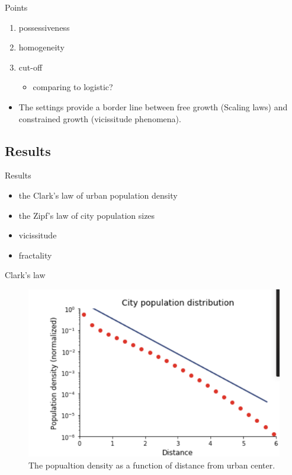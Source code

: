 \documentclass{beamer}
\begin{document}
\begin{frame}{Points}
  \begin{enumerate}
    \item possessiveness
    \item homogeneity
    \item cut-off
    \begin{itemize}
    \item comparing to logistic?
    \end{itemize}
  \end{enumerate}
  \vspace{1cm}
  \begin{itemize}
    \item The settings provide a border line between free growth (Scaling laws) and constrained growth (vicissitude phenomena).
  \end{itemize}
  
\end{frame}

\subsection{Results}
\begin{frame}{Results}
  \begin{itemize}
    \item the Clark's law of urban population density
    \item the Zipf's law of city population sizes
    \item vicissitude
    \item fractality
  \end{itemize}
\end{frame}

\begin{frame}{Clark's law}
  \begin{figure}
    \includegraphics[width = 0.8\linewidth]{pics/clark.png}
    \caption{The popualtion density as a function of distance from urban center.}
  \end{figure}
\end{frame}
\end{document}
